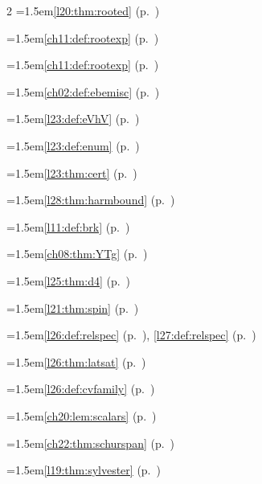 \begin{multicols}{2}
\hangindent=1.5em\quad \ref{l20:thm:rooted} (p.~\pageref{l20:thm:rooted})\par
\hangindent=1.5em\quad \ref{ch11:def:rootexp} (p.~\pageref{ch11:def:rootexp})\par
\hangindent=1.5em\quad \ref{ch11:def:rootexp} (p.~\pageref{ch11:def:rootexp})\par
\hangindent=1.5em\quad \ref{ch02:def:ebemisc} (p.~\pageref{ch02:def:ebemisc})\par
\hangindent=1.5em\quad \ref{l23:def:eVhV} (p.~\pageref{l23:def:eVhV})\par
\hangindent=1.5em\quad \ref{l23:def:enum} (p.~\pageref{l23:def:enum})\par
\hangindent=1.5em\quad \ref{l23:thm:cert} (p.~\pageref{l23:thm:cert})\par
\hangindent=1.5em\quad \ref{l28:thm:harmbound} (p.~\pageref{l28:thm:harmbound})\par
\hangindent=1.5em\quad \ref{l11:def:brk} (p.~\pageref{l11:def:brk})\par
\hangindent=1.5em\quad \ref{ch08:thm:YTg} (p.~\pageref{ch08:thm:YTg})\par
\par{}\par\nopagebreak\smallskip
\hangindent=1.5em\quad \ref{l25:thm:d4} (p.~\pageref{l25:thm:d4})\par
\hangindent=1.5em\quad \ref{l21:thm:spin} (p.~\pageref{l21:thm:spin})\par
\hangindent=1.5em\quad \ref{l26:def:relspec} (p.~\pageref{l26:def:relspec}), \ref{l27:def:relspec} (p.~\pageref{l27:def:relspec})\par
\hangindent=1.5em\quad \ref{l26:thm:latsat} (p.~\pageref{l26:thm:latsat})\par
\hangindent=1.5em\quad \ref{l26:def:cvfamily} (p.~\pageref{l26:def:cvfamily})\par
\hangindent=1.5em\quad \ref{ch20:lem:scalars} (p.~\pageref{ch20:lem:scalars})\par
\hangindent=1.5em\quad \ref{ch22:thm:schurspan} (p.~\pageref{ch22:thm:schurspan})\par
\hangindent=1.5em\quad \ref{l19:thm:sylvester} (p.~\pageref{l19:thm:sylvester})\par

\end{multicols}
